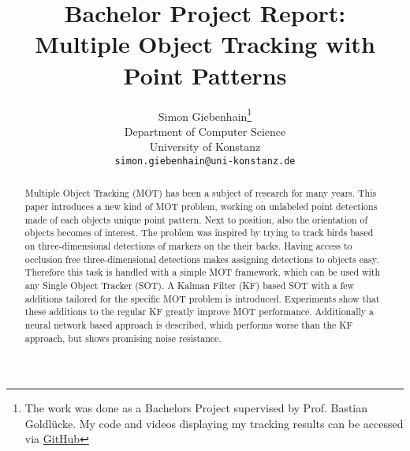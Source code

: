\documentclass[12pt,a4paper]{article}
\title{Bachelor Project Report: \\ Multiple Object Tracking with Point Patterns}
\author{
  Simon Giebenhain\thanks{The work was done as a Bachelors Project supervised by Prof. Bastian Goldlücke. My code and videos displaying my tracking results can be accessed via \href{https://github.com/SimonGiebenhain/tracking}{GitHub}} \\
  Department of Computer Science\\
  University of Konstanz\\
  \texttt{simon.giebenhain@uni-konstanz.de} \\
}
\begin{document}
\maketitle
\newpage
\begin{abstract}
Multiple Object Tracking (MOT) has been a subject of research for many years. This paper introduces a new kind of MOT problem, working on unlabeled point detections made of each objects unique point pattern. Next to position, also the orientation of objects becomes of interest. The problem was inspired by trying to track birds based on three-dimensional detections of markers on the their backs. Having access to occlusion free three-dimensional detections makes assigning detections to objects easy. Therefore this task is handled with a simple MOT framework, which can be used with any Single Object Tracker (SOT). A Kalman Filter (KF) based SOT with a few additions tailored for the specific MOT problem is introduced. Experiments show that these additions to the regular KF greatly improve MOT performance. Additionally a neural network based approach is described, which performs worse than the KF approach, but shows promising noise resistance.
\end{abstract}
\newpage
\tableofcontents
\newpage


\end{document}
